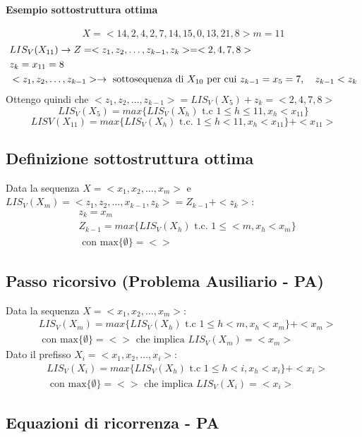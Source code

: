 \paragraph*{Esempio sottostruttura ottima}
\[X = <14, 2, 4, 2, 7, 14, 15, 0, 13, 21, 8> m = 11\]
\begin{align*}
    &LIS_V(X_{11}) \rightarrow Z=<z_1, z_2, \dots, z_{k-1}, z_k> = <2,4,7,8>\\
    &z_k = x_{11} = 8\\
    &<z_1,z_2,\dots, z_{k-1}> \rightarrow \text{ sottosequenza di }X_{10} \text{ per cui } z_{k-1}=x_5 = 7, \quad z_{k-1}<z_k\\
\end{align*}
Ottengo quindi che $<z_1,z_2,\dots, z_{k-1}> = LIS_V(X_5) + z_k = <2,4,7,8>$\\
\[LIS_V(X_5) = max\{LIS_V(X_h) \text{ t.c } 1 \leq h \leq 11, x_h < x_11\}\]
\[LISV(X_11) = max\{LIS_V(X_h) \text{ t.c. } 1 \leq h < 11, x_h < x_11\} + <x_11>\]
\subsection{Definizione sottostruttura ottima}
Data la sequenza $X=<x_1, x_2, \dots, x_m>$ e $LIS_V(X_m) = <z_1, z_2,\dots, x_{k-1}, z_k> = Z_{k-1} + <z_k>$:
\begin{align*}
    &z_k = x_m\\
    &Z_{k-1}=max\{LIS_V(X_h) \text{ t.c. } 1 \leq < m, x_h < x_m\}\\
    &\text{ con max}\{\emptyset \} = <>
\end{align*}
\subsection{Passo ricorsivo (Problema Ausiliario - PA)}
Data la sequenza $X = <x_1, x_2, \dots, x_m>$:
\begin{align*}
    &LIS_V(X_m) = max\{LIS_V(X_h) \text{ t.c } 1 \leq h < m, x_h < x_m\}+ <x_m>\\ 
    &\text{ con max}\{\emptyset\}=<> \text{ che implica } LIS_V(X_m) = <x_m>
\end{align*}
Dato il prefisso $X_i = <x_1, x_2, \dots, x_i>:$
\begin{align*}
    &LIS_V(X_i) = max\{LIS_V(X_h) \text{ t.c } 1 \leq h < i, x_h < x_i\}+ <x_i>\\ 
    &\text{ con max}\{\emptyset\}=<> \text{ che implica } LIS_V(X_i) = <x_i>
\end{align*}
\subsection{Equazioni di ricorrenza - PA}
